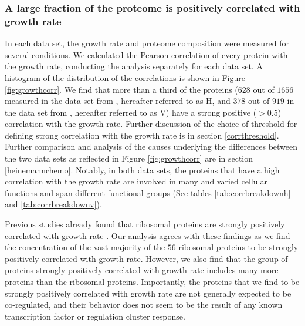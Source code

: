 \subsubsection{A large fraction of the proteome is positively correlated with growth rate}
In each data set, the growth rate and proteome composition were measured for several conditions.
We calculated the Pearson correlation of every protein with the growth rate, conducting the analysis separately for each data set.
A histogram of the distribution of the correlations is shown in Figure \ref{fig:growthcorr}.
We find that more than a third of the proteins ($628$ out of $1656$ measured in the data set from \cite{Heinemann2015}, hereafter referred to as H, and $378$ out of $919$ in the data set from \cite{Valgepea2013}, hereafter referred to as V) have a strong positive ($>0.5$) correlation with the growth rate.
Further discussion of the choice of threshold for defining strong correlation with the growth rate is in section \ref{corrthreshold}.
Further comparison and analysis of the causes underlying the differences between the two data sets as reflected in Figure \ref{fig:growthcorr} are in section \ref{heinemannchemo}.
Notably, in both data sets, the proteins that have a high correlation with the growth rate are involved in many and varied cellular functions and span different functional groups (See tables \ref{tab:corrbreakdownh} and \ref{tab:corrbreakdownv}).

Previous studies already found that ribosomal proteins are strongly positively correlated with growth rate \cite{Pedersen1978a, ingraham1983growth, Klumpp2008}.
Our analysis agrees with these findings as we find the concentration of the vast majority of the $56$ ribosomal proteins to be strongly positively correlated with growth rate.
However, we also find that the group of proteins strongly positively correlated with growth rate includes many more proteins than the ribosomal proteins.
Importantly, the proteins that we find to be strongly positively correlated with growth rate are not generally expected to be co-regulated, and their behavior does not seem to be the result of any known transcription factor or regulation cluster response.